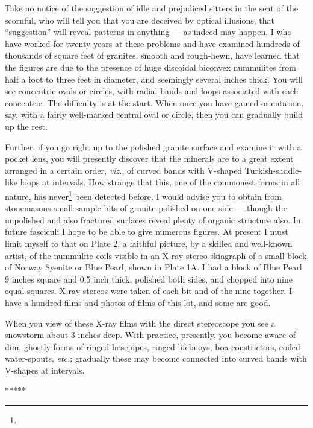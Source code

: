\documentclass[a4paper, 12pt, oneside]{article}
\begin{document}
Take no notice of the suggestion of idle and prejudiced sitters in the seat of the scornful, who will tell you that you are deceived by optical illusions, that ``suggestion'' will reveal patterns in anything --- as indeed may happen. I who have worked for twenty years at these problems and have examined hundreds of thousands of square feet of granites, smooth and rough-hewn, have learned that the figures are due to the presence of huge discoidal biconvex nummulites from half a foot to three feet in diameter, and seemingly several inches thick. You will see concentric ovals or circles, with radial bands and loops associated with each concentric. The difficulty is at the start. When once you have gained orientation, say, with a fairly well-marked central oval or circle, then you can gradually build up the rest.

Further, if you go right up to the polished granite surface and examine it with a pocket lens, you will presently discover that the minerals are to a great extent arranged in a certain order, \emph{viz.}, of curved bands with V-shaped Turkish-saddle-like loops at intervals. How strange that this, one of the commonest forms in all nature, has never\footnote{} been detected before. I would advise you to obtain from stonemasons small sample bits of granite polished on one side --- though the unpolished and also fractured surfaces reveal plenty of organic structure also. In future fasciculi I hope to be able to give numerous figures. At present I must limit myself to that on Plate 2, a faithful picture, by a skilled and well-known artist, of the nummulite coils visible in an X-ray stereo-skiagraph of a small block of Norway Syenite or Blue Pearl, shown in Plate 1A. I had a block of Blue Pearl 9 inches square and 0.5 inch thick, polished both sides, and chopped into nine equal squares. X-ray stereos were taken of each bit and of the nine together. I have a hundred films and photos of films of this lot, and some are good.

When you view of these X-ray films with the direct stereoscope you see a snowstorm about 3 inches deep. With practice, presently, you become aware of dim, ghostly forms of ringed hosepipes, ringed lifebuoys, boa-constrictors, coiled water-spouts, \emph{etc.}; gradually these may become connected into curved bands with V-shapes at intervals.

\centerline{*\hspace{15mm}*\hspace{15mm}*\hspace{15mm}*\hspace{15mm}*}
\bigskip
\end{document}
